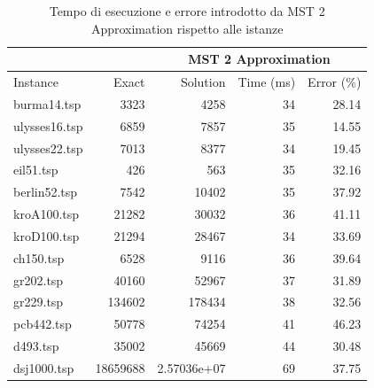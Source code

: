 \begin{table}[h]
    \centering

    \begin{tabular}{lrrrr}
    \toprule
    \multicolumn{2}{c}{ } & \multicolumn{3}{c}{MST 2 Approximation} \\
    \hline
    Instance & Exact & Solution &   Time (ms) &   Error (\%) \\
    \hline
    burma14.tsp   &     3323 &   4258           &          34 &       28.14 \\
    ulysses16.tsp &     6859 &   7857           &          35 &       14.55 \\
    ulysses22.tsp &     7013 &   8377           &          34 &       19.45 \\
    eil51.tsp     &      426 &    563           &          35 &       32.16 \\
    berlin52.tsp  &     7542 &  10402           &          35 &       37.92 \\
    kroA100.tsp   &    21282 &  30032           &          36 &       41.11 \\
    kroD100.tsp   &    21294 &  28467           &          34 &       33.69 \\
    ch150.tsp     &     6528 &   9116           &          36 &       39.64 \\
    gr202.tsp     &    40160 &  52967           &          37 &       31.89 \\
    gr229.tsp     &   134602 & 178434           &          38 &       32.56 \\
    pcb442.tsp    &    50778 &  74254           &          41 &       46.23 \\
    d493.tsp      &    35002 &  45669           &          44 &       30.48 \\
    dsj1000.tsp   & 18659688 &      2.57036e+07 &          69 &       37.75 \\
    \bottomrule
    \end{tabular}

    \caption{Tempo di esecuzione e errore introdotto da MST 2 Approximation rispetto alle istanze}
    \label{table:mst2approx-runtime-accuracy}
\end{table}

